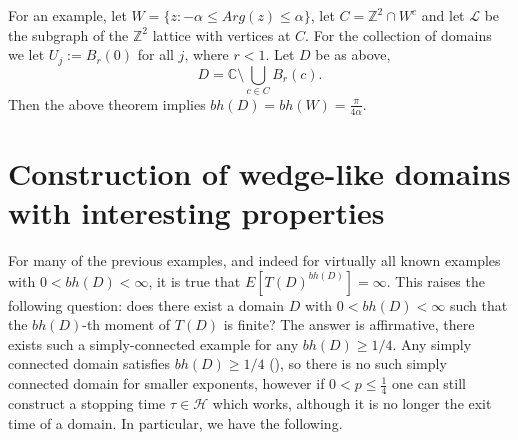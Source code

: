\documentclass[a4paper, oneside, 12pt]{amsart}
\newcommand{\mc}{\mathcal}
\newcommand{\Z}{\mathbb{Z}}
\newcommand{\CC}{\mathbb{C}}
\begin{document}
For an example, let $W = \{z:-\alpha\leq Arg(z)\leq\alpha\}$, let $C = \Z^2 \cap W^c$ and let $\mc{L}$ be the subgraph of the $\Z^2$ lattice with 
vertices at $C$. For the collection of domains we let $U_j := B_r(0)$ for all $j$, where $r < 1$. Let $D$ be as above,
$$
    D = \CC \setminus \bigcup_{c \in C} B_r(c).
$$
Then the above theorem implies $bh(D) = bh(W) = \frac{\pi}{4\alpha}$.

\section{Construction of wedge-like domains with interesting properties} \label{achievecrit}

For many of the previous examples, and indeed for virtually all known examples with $0 < bh(D) < \infty$, it is true that $E[T(D)^{bh(D)}] = \infty$. This raises the following question: does there exist a domain $D$ with $0 < bh(D) < \infty$ such that the $bh(D)$-th moment of $T(D)$
is finite? The answer is affirmative, there exists such a simply-connected example for any $bh(D) \geq 1/4$. Any simply connected domain satisfies $bh(D) \geq 1/4$ (\cite{burk}), so there is no such simply connected domain for smaller exponents, however if $0<p\leq \frac{1}{4}$ one can still construct a stopping time $\tau\in\mc{H}$ which works, although it is no longer the exit time of a domain. In particular, we have the following.
\end{document}

